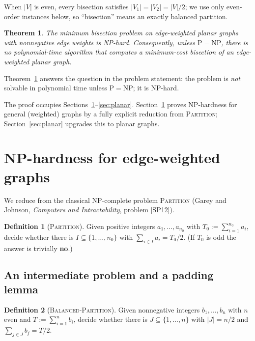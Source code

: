 \documentclass{amsart}
\theoremstyle{plain}
\newtheorem{theorem}{Theorem}
\theoremstyle{definition}
\newtheorem{definition}{Definition}
\theoremstyle{remark}
\begin{document}
When $|V|$ is even, every bisection satisfies $|V_1|=|V_2|=|V|/2$; we use only
even-order instances below, so ``bisection'' means an exactly balanced partition.

\begin{theorem}\label{thm:main}
The minimum bisection problem on edge-weighted planar graphs with nonnegative edge
weights is NP-hard. Consequently, unless $\mathrm{P}=\mathrm{NP}$, there is no
polynomial-time algorithm that computes a minimum-cost bisection of an edge-weighted
planar graph.
\end{theorem}

Theorem~\ref{thm:main} answers the question in the problem statement: the problem is
\emph{not} solvable in polynomial time unless $\mathrm{P}=\mathrm{NP}$; it is NP-hard.

\medskip

The proof occupies Sections~\ref{sec:reduction}--\ref{sec:planar}. Section~\ref{sec:reduction}
proves NP-hardness for general (weighted) graphs by a fully explicit reduction from
\textsc{Partition}; Section~\ref{sec:planar} upgrades this to planar graphs.

\section{NP-hardness for edge-weighted graphs}\label{sec:reduction}

We reduce from the classical NP-complete problem \textsc{Partition}
(Garey and Johnson, \emph{Computers and Intractability}, problem [SP12]).

\begin{definition}[\textsc{Partition}]
Given positive integers $a_1,\dots,a_{n_0}$ with $T_0:=\sum_{i=1}^{n_0} a_i$, decide
whether there is $I\subseteq\{1,\dots,n_0\}$ with $\sum_{i\in I} a_i = T_0/2$.
(If $T_0$ is odd the answer is trivially \textbf{no}.)
\end{definition}

\subsection{An intermediate problem and a padding lemma}

\begin{definition}[\textsc{Balanced-Partition}]
Given nonnegative integers $b_1,\dots,b_n$ with $n$ even and $T:=\sum_{i=1}^{n} b_i$,
decide whether there is $J\subseteq\{1,\dots,n\}$ with $|J|=n/2$ and
$\sum_{j\in J} b_j = T/2$.
\end{definition}
\end{document}
